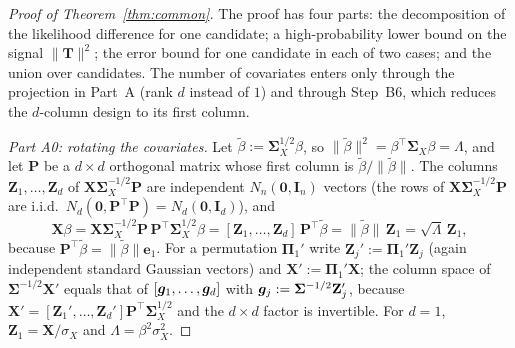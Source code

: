 \documentclass[11pt]{article}
\theoremstyle{definition}
\newcommand{\bX}{\mathbf{X}}
\newcommand{\bT}{\mathbf{T}}
\newcommand{\bZ}{\mathbf{Z}}
\newcommand{\bI}{\mathbf{I}}
\newcommand{\bzero}{\mathbf{0}}
\newcommand{\bSig}{\boldsymbol{\Sigma}}
\newcommand{\bPi}{\boldsymbol{\Pi}}
\begin{document}
\begin{proof}[Proof of Theorem~\ref{thm:common}]
The proof has four parts: the decomposition of the likelihood difference for one candidate; a high-probability lower bound on the signal $\|\bT\|^2$; the error bound for one candidate in each of two cases; and the union over candidates. The number of covariates enters only through the projection in Part~A (rank $d$ instead of $1$) and through Step~B6, which reduces the $d$-column design to its first column.

\emph{Part A0: rotating the covariates.} Let $\tilde\beta:=\bSig_X^{1/2}\beta$, so $\|\tilde\beta\|^2=\beta^\top\bSig_X\beta=\Lambda$, and let $\mathbf P$ be a $d\times d$ orthogonal matrix whose first column is $\tilde\beta/\|\tilde\beta\|$. The columns $\bZ_1,\dots,\bZ_d$ of $\bX\bSig_X^{-1/2}\mathbf P$ are independent $N_n(\bzero,\bI_n)$ vectors (the rows of $\bX\bSig_X^{-1/2}\mathbf P$ are i.i.d.\ $N_d(\bzero,\mathbf P^\top\mathbf P)=N_d(\bzero,\bI_d)$), and
\[
\bX\beta=\bX\bSig_X^{-1/2}\mathbf P\,\mathbf P^\top\bSig_X^{1/2}\beta=[\bZ_1,\dots,\bZ_d]\,\mathbf P^\top\tilde\beta=\|\tilde\beta\|\,\bZ_1=\sqrt\Lambda\,\bZ_1,
\]
because $\mathbf P^\top\tilde\beta=\|\tilde\beta\|\bm e_1$. For a permutation $\bPi_1'$ write $\bZ_j':=\bPi_1'\bZ_j$ (again independent standard Gaussian vectors) and $\bX':=\bPi_1'\bX$; the column space of $\bSig^{-1/2}\bX'$ equals that of $[\bm{g}_1,\dots,\bm{g}_d]$ with $\bg_j:=\bSig^{-1/2}\bZ_j'$, because $\bX'=[\bZ_1',\dots,\bZ_d']\mathbf P^\top\bSig_X^{1/2}$ and the $d\times d$ factor is invertible. For $d=1$, $\bZ_1=\bX/\sigma_X$ and $\Lambda=\beta^2\sigma_X^2$.


\end{proof}
\end{document}
